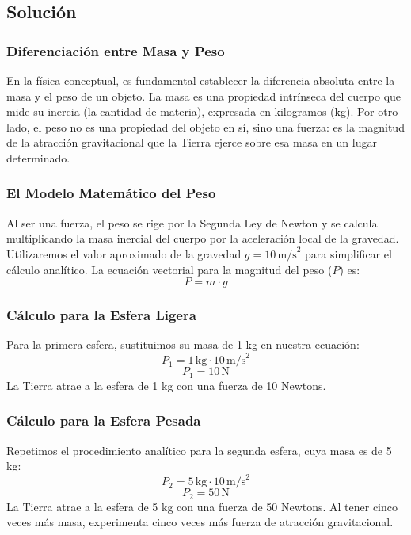 \documentclass[12pt]{article}
\begin{document}
\subsection*{Solución}

\subsubsection*{Diferenciación entre Masa y Peso}
En la física conceptual, es fundamental establecer la diferencia absoluta entre la masa y el peso de un objeto. La masa es una propiedad intrínseca del cuerpo que mide su inercia (la cantidad de materia), expresada en kilogramos (kg). Por otro lado, el peso no es una propiedad del objeto en sí, sino una fuerza: es la magnitud de la atracción gravitacional que la Tierra ejerce sobre esa masa en un lugar determinado.

\subsubsection*{El Modelo Matemático del Peso}
Al ser una fuerza, el peso se rige por la Segunda Ley de Newton y se calcula multiplicando la masa inercial del cuerpo por la aceleración local de la gravedad. Utilizaremos el valor aproximado de la gravedad $g = 10 \, \text{m/s}^2$ para simplificar el cálculo analítico.
La ecuación vectorial para la magnitud del peso ($P$) es:
\begin{equation}
    P = m \cdot g
\end{equation}

\subsubsection*{Cálculo para la Esfera Ligera}
Para la primera esfera, sustituimos su masa de 1 kg en nuestra ecuación:
\begin{equation}
    P_1 = 1 \, \text{kg} \cdot 10 \, \text{m/s}^2
\end{equation}
\begin{equation}
    P_1 = 10 \, \text{N}
\end{equation}
La Tierra atrae a la esfera de 1 kg con una fuerza de 10 Newtons.

\subsubsection*{Cálculo para la Esfera Pesada}
Repetimos el procedimiento analítico para la segunda esfera, cuya masa es de 5 kg:
\begin{equation}
    P_2 = 5 \, \text{kg} \cdot 10 \, \text{m/s}^2
\end{equation}
\begin{equation}
    P_2 = 50 \, \text{N}
\end{equation}
La Tierra atrae a la esfera de 5 kg con una fuerza de 50 Newtons. Al tener cinco veces más masa, experimenta cinco veces más fuerza de atracción gravitacional.
\end{document}
